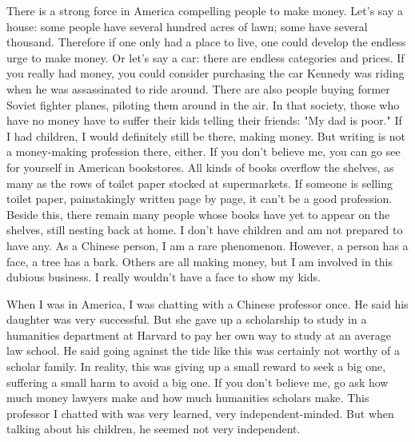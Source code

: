 There is a strong force in America compelling people to make money. Let's say a house: some people have several hundred acres of lawn; some have several thousand. Therefore if one only had a place to live, one could develop the endless urge to make money. Or let's say a car: there are endless categories and prices. If you really had money, you could consider purchasing the car Kennedy was riding when he was assassinated to ride around. There are also people buying former Soviet fighter planes, piloting them around in the air. In that society, those who have no money have to suffer their kids telling their friends: "My dad is poor." If I had children, I would definitely still be there, making money. But writing is not a money-making profession there, either. If you don't believe me, you can go see for yourself in American bookstores. All kinds of books overflow the shelves, as many as the rows of toilet paper stocked at supermarkets. If someone is selling toilet paper, painstakingly written page by page, it can't be a good profession. Beside this, there remain many people whose books have yet to appear on the shelves, still nesting back at home. I don't have children and am not prepared to have any. As a Chinese person, I am a rare phenomenon. However, a person has a face, a tree has a bark. Others are all making money, but I am involved in this dubious business. I really wouldn't have a face to show my kids. 

When I was in America, I was chatting with a Chinese professor once. He said his daughter was very successful. But she gave up a scholarship to study in a humanities department at Harvard to pay her own way to study at an average law school. He said going against the tide like this was certainly not worthy of a scholar family. In reality, this was giving up a small reward to seek a big one, suffering a small harm to avoid a big one. If you don't believe me, go ask how much money lawyers make and how much humanities scholars make. This professor I chatted with was very learned, very independent-minded. But when talking about his children, he seemed not very independent. 

